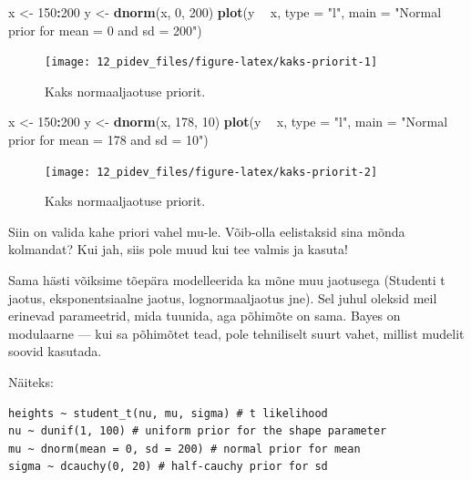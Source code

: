 \documentclass[]{book}
\newenvironment{Shaded}{\begin{snugshade}}{\end{snugshade}}
\newcommand{\KeywordTok}[1]{\textcolor[rgb]{0.13,0.29,0.53}{\textbf{#1}}}
\newcommand{\DataTypeTok}[1]{\textcolor[rgb]{0.13,0.29,0.53}{#1}}
\newcommand{\DecValTok}[1]{\textcolor[rgb]{0.00,0.00,0.81}{#1}}
\newcommand{\StringTok}[1]{\textcolor[rgb]{0.31,0.60,0.02}{#1}}
\newcommand{\OperatorTok}[1]{\textcolor[rgb]{0.81,0.36,0.00}{\textbf{#1}}}
\newcommand{\NormalTok}[1]{#1}
\begin{document}
\begin{Shaded}
\begin{Highlighting}[]
\NormalTok{x <-}\StringTok{ }\DecValTok{150}\OperatorTok{:}\DecValTok{200}
\NormalTok{y <-}\StringTok{ }\KeywordTok{dnorm}\NormalTok{(x, }\DecValTok{0}\NormalTok{, }\DecValTok{200}\NormalTok{)}
\KeywordTok{plot}\NormalTok{(y }\OperatorTok{~}\StringTok{ }\NormalTok{x, }\DataTypeTok{type =} \StringTok{"l"}\NormalTok{, }\DataTypeTok{main =} \StringTok{"Normal prior for mean = 0 and sd = 200"}\NormalTok{)}
\end{Highlighting}
\end{Shaded}

\begin{figure}
\texttt{[image: 12\_pidev\_files/figure-latex/kaks-priorit-1]} \caption{Kaks normaaljaotuse priorit.}\label{fig:kaks-priorit1}
\end{figure}

\begin{Shaded}
\begin{Highlighting}[]
\NormalTok{x <-}\StringTok{ }\DecValTok{150}\OperatorTok{:}\DecValTok{200}
\NormalTok{y <-}\StringTok{ }\KeywordTok{dnorm}\NormalTok{(x, }\DecValTok{178}\NormalTok{, }\DecValTok{10}\NormalTok{)}
\KeywordTok{plot}\NormalTok{(y }\OperatorTok{~}\StringTok{ }\NormalTok{x, }\DataTypeTok{type =} \StringTok{"l"}\NormalTok{, }\DataTypeTok{main =} \StringTok{"Normal prior for mean = 178 and sd = 10"}\NormalTok{)}
\end{Highlighting}
\end{Shaded}

\begin{figure}
\texttt{[image: 12\_pidev\_files/figure-latex/kaks-priorit-2]} \caption{Kaks normaaljaotuse priorit.}\label{fig:kaks-priorit2}
\end{figure}

Siin on valida kahe priori vahel mu-le. Võib-olla eelistaksid sina mõnda
kolmandat? Kui jah, siis pole muud kui tee valmis ja kasuta!

Sama hästi võiksime tõepära modelleerida ka mõne muu jaotusega (Studenti
t jaotus, eksponentsiaalne jaotus, lognormaaljaotus jne). Sel juhul
oleksid meil erinevad parameetrid, mida tuunida, aga põhimõte on sama.
Bayes on modulaarne --- kui sa põhimõtet tead, pole tehniliselt suurt
vahet, millist mudelit soovid kasutada.

Näiteks:

\begin{verbatim}
heights ~ student_t(nu, mu, sigma) # t likelihood
nu ~ dunif(1, 100) # uniform prior for the shape parameter
mu ~ dnorm(mean = 0, sd = 200) # normal prior for mean
sigma ~ dcauchy(0, 20) # half-cauchy prior for sd
\end{verbatim}
\end{document}
